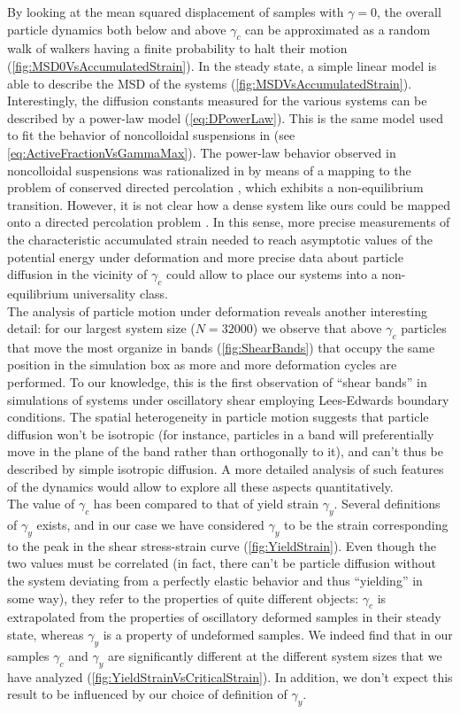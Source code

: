 By looking at the mean squared displacement of samples with $\gamma = 0$, the overall particle dynamics both below and above $\gamma_{c}$ can be approximated as a random walk of walkers having a finite probability to halt their motion (\autoref{fig:MSD0VsAccumulatedStrain}). In the steady state, a simple linear model is able to describe the MSD of the systems (\autoref{fig:MSDVsAccumulatedStrain}). Interestingly, the diffusion constants measured for the various systems can be described by a power-law model (\autoref{eq:DPowerLaw}). This is the same model used to fit the behavior of noncolloidal suspensions in \cite{corte2008random} (see \autoref{eq:ActiveFractionVsGammaMax}). The power-law behavior observed in noncolloidal suspensions was rationalized in \cite{corte2008random} by means of a mapping to the problem of conserved directed percolation \cite{menon2009universality}, which exhibits a non-equilibrium transition. However, it is not clear how a dense system like ours could be mapped onto a directed percolation problem \cite{ramaswamy2012private}. In this sense, more precise measurements of the characteristic accumulated strain needed to reach asymptotic values of the potential energy under deformation and more precise data about particle diffusion in the vicinity of $\gamma_{c}$ could allow to place our systems into a non-equilibrium universality class. \\
The analysis of particle motion under deformation reveals another interesting detail: for our largest system size ($N=32000$) we observe that above $\gamma_{c}$ particles that move the most organize in bands (\autoref{fig:ShearBands}) that occupy the same position in the simulation box as more and more deformation cycles are performed. To our knowledge, this is the first observation of ``shear bands'' in simulations of systems under oscillatory shear employing Lees-Edwards boundary conditions. The spatial heterogeneity in particle motion suggests that particle diffusion won't be isotropic (for instance, particles in a band will preferentially move in the plane of the band rather than orthogonally to it), and can't thus be described by simple isotropic diffusion. A more detailed analysis of such features of the dynamics would allow to explore all these aspects quantitatively. \\
The value of $\gamma_{c}$ has been compared to that of yield strain $\gamma_{y}$. Several definitions of $\gamma_{y}$ exists, and in our case we have considered $\gamma_{y}$ to be the strain corresponding to the peak in the shear stress-strain curve (\autoref{fig:YieldStrain}). Even though the two values must be correlated (in fact, there can't be particle diffusion without the system deviating from a perfectly elastic behavior and thus ``yielding'' in some way), they refer to the properties of quite different objects: $\gamma_{c}$ is extrapolated from the properties of oscillatory deformed samples in their steady state, whereas $\gamma_{y}$ is a property of undeformed samples. We indeed find that in our samples $\gamma_{c}$ and $\gamma_{y}$ are significantly different at the different system sizes that we have analyzed (\autoref{fig:YieldStrainVsCriticalStrain}). In addition, we don't expect this result to be influenced by our choice of definition of $\gamma_{y}$.\\
